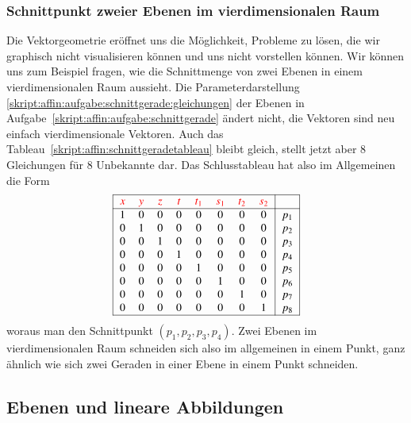 \subsubsection{Schnittpunkt zweier Ebenen im vierdimensionalen Raum}
Die Vektorgeometrie eröffnet uns die Möglichkeit, Probleme zu lösen,
die wir graphisch nicht visualisieren können und uns nicht vorstellen
können.
Wir können uns zum Beispiel fragen, wie die Schnittmenge von zwei Ebenen
in einem vierdimensionalen Raum aussieht.
Die Parameterdarstellung
\eqref{skript:affin:aufgabe:schnittgerade:gleichungen}
der Ebenen
in Aufgabe~\ref{skript:affin:aufgabe:schnittgerade}
ändert nicht, die Vektoren sind neu
einfach vierdimensionale Vektoren.
Auch das Tableau~\eqref{skript:affin:schnittgeradetableau} bleibt gleich,
stellt jetzt aber 8 Gleichungen für 8 Unbekannte dar.
Das Schlusstableau hat also im Allgemeinen die Form
\[
\begin{tabular}{|
>{$}c<{$}
>{$}c<{$}
>{$}c<{$}
>{$}c<{$}
>{$}c<{$}
>{$}c<{$}
>{$}c<{$}
>{$}c<{$}|
>{$}c<{$}|}
\hline
\color{red}x&
\color{red}y&
\color{red}z&
\color{red}t&
\color{red}t_1&
\color{red}s_1&
\color{red}t_2&
\color{red}s_2&
\\
\hline
1&0&0&0&0&0&0&0&p_1\\
0&1&0&0&0&0&0&0&p_2\\
0&0&1&0&0&0&0&0&p_3\\
0&0&0&1&0&0&0&0&p_4\\
0&0&0&0&1&0&0&0&p_5\\
0&0&0&0&0&1&0&0&p_6\\
0&0&0&0&0&0&1&0&p_7\\
0&0&0&0&0&0&0&1&p_8\\
\hline
\end{tabular}
\]
woraus man den Schnittpunkt  $(p_1,p_2,p_3,p_4)$.
Zwei Ebenen im vierdimensionalen Raum schneiden sich also im allgemeinen
in einem Punkt, ganz ähnlich wie sich zwei Geraden in einer Ebene in
einem Punkt schneiden.

\subsection{Ebenen und lineare Abbildungen}

